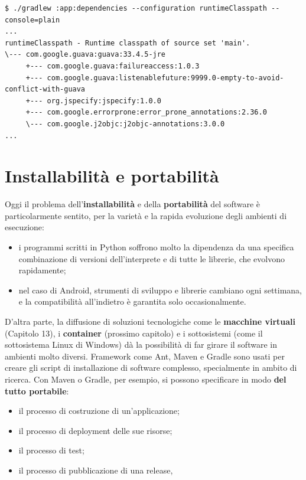 \begin{lstlisting}[style=shell, name=Terminale]
$ ./gradlew :app:dependencies --configuration runtimeClasspath --console=plain
...
runtimeClasspath - Runtime classpath of source set 'main'.
\--- com.google.guava:guava:33.4.5-jre
     +--- com.google.guava:failureaccess:1.0.3
     +--- com.google.guava:listenablefuture:9999.0-empty-to-avoid-conflict-with-guava
     +--- org.jspecify:jspecify:1.0.0
     +--- com.google.errorprone:error_prone_annotations:2.36.0
     \--- com.google.j2objc:j2objc-annotations:3.0.0
...
\end{lstlisting}

\section{Installabilità e portabilità}

Oggi il problema dell'\textbf{installabilità} e della \textbf{portabilità} del software è particolarmente sentito, per
la varietà e la rapida evoluzione degli ambienti di esecuzione:

\begin{itemize}
  \item i programmi scritti in Python soffrono molto la dipendenza da una specifica combinazione di versioni
        dell'interprete e di tutte le librerie, che evolvono rapidamente;
  \item nel caso di Android, strumenti di sviluppo e librerie cambiano ogni settimana, e la compatibilità all'indietro è
        garantita solo occasionalmente.
\end{itemize}

D'altra parte, la diffusione di soluzioni tecnologiche come le \textbf{macchine virtuali} (Capitolo 13), i
\textbf{container} (prossimo capitolo) e i sottosistemi (come il sottosistema Linux di Windows) dà la
possibilità di far girare il software in ambienti molto diversi. Framework come Ant, Maven e Gradle sono usati per
creare gli script di installazione di software complesso, specialmente in ambito di ricerca. Con Maven o Gradle, per
esempio, si possono specificare in modo \textbf{del tutto portabile}:

\begin{itemize}
  \item il processo di costruzione di un'applicazione;
  \item il processo di deployment delle sue risorse;
  \item il processo di test;
  \item il processo di pubblicazione di una release,
\end{itemize}

